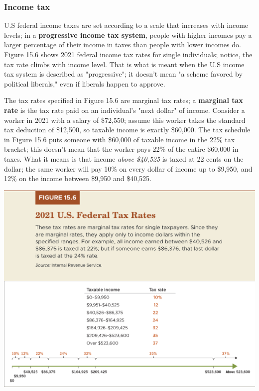 \documentclass[11pt]{article} %
\begin{document}
\subsubsection*{Income tax}
U.S federal income taxes are set according to a scale that increases with income levels; in a \textbf{progressive income tax system}, people with higher incomes pay  a larger percentage of their income in taxes than people with lower incomes do. Figure 15.6 shows 2021 federal income tax rates for single individuals; notice, the tax rate climbs with income level. That is what is meant when the U.S income tax system is described as "progressive"; it doesn't mean "a scheme favored by political liberals," even if liberals happen to approve.

The tax rates specified in Figure 15.6 are marginal tax rates; a \textbf{marginal tax rate} is the tax rate paid on an individual's "next dollar" of income. Consider a worker in 2021 with a salary of \$72,550; assume this worker takes the standard tax deduction of \$12,500, so taxable income is exactly \$60,000. The tax schedule in Figure 15.6 puts someone with \$60,000 of taxable income in the 22\% tax bracket; this doesn't mean that the worker pays 22\% of the entire \$60,000 in taxes. What it means is that income \textit{above \$40,525} is taxed at 22 cents on the dollar; the same worker will pay 10\% on every dollar of income up to \$9,950, and 12\% on the income between \$9,950 and \$40,525.

\begin{center}
\includegraphics[scale=0.5]{images/Figure 15.6.png} 
\end{center}
\end{document}
